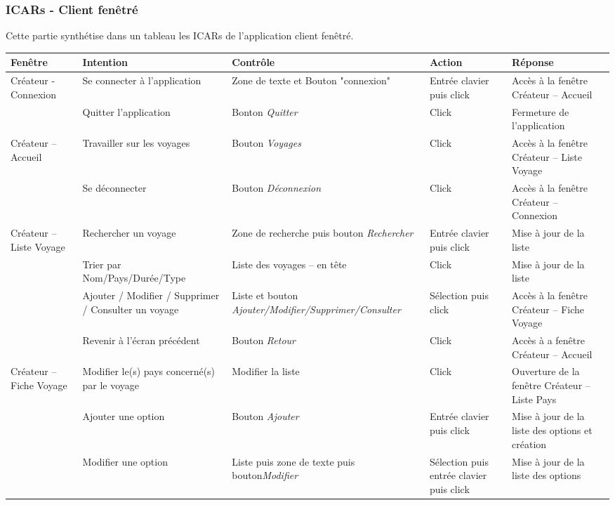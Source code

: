 \documentclass[11pt]{article}
\begin{document}
\subsubsection{ICARs - Client fenêtré}
Cette partie synthétise dans un tableau les ICARs de l'application client fenêtré.\\
\begin{center}
\begin{footnotesize}
\begin{supertabular}{|p{2cm}|p{3cm}|p{3.5cm}|p{2cm}|p{4cm}|}
\hline         
\bf{Fenêtre} & \bf{Intention} & \bf{Contrôle} & \bf{Action} & \bf{Réponse} \\ \hline
Créateur - Connexion & Se connecter à l'application & Zone de texte et Bouton "connexion" & Entrée clavier puis click & Accès à la fenêtre Créateur – Accueil   \\ \hline
& Quitter l'application & Bonton \emph{Quitter} & Click & Fermeture de l'application \\ \hline
Créateur – Accueil & Travailler sur les voyages & Bouton \emph{Voyages} & Click & Accès à la fenêtre Créateur – Liste Voyage \\ \hline
 & Se déconnecter & Bouton \emph{Déconnexion} & Click & Accès à la fenêtre Créateur – Connexion \\ \hline
Créateur – Liste Voyage & Rechercher un voyage & Zone de recherche puis bouton \emph{Rechercher} & Entrée clavier puis click & Mise à jour de la liste \\ \hline
 & Trier par Nom/Pays/Durée/Type & Liste des voyages – en tête & Click & Mise à jour de la liste \\ \hline
 & Ajouter / Modifier / Supprimer / Consulter un voyage & Liste et bouton \emph{Ajouter/Modifier/Supprimer/Consulter} & Sélection puis click & Accès à la fenêtre Créateur – Fiche Voyage \\ \hline
 & Revenir à l’écran précédent & Bouton \emph{Retour} & Click & Accès à a fenêtre Créateur – Accueil \\ \hline
Créateur – Fiche Voyage & Modifier le(s) pays concerné(s) par le voyage & Modifier la liste & Click & Ouverture de la  fenêtre Créateur – Liste Pays \\ \hline
 & Ajouter une option & Bouton \emph{Ajouter} & Entrée clavier puis click & Mise à jour de la  liste des options et création \\ \hline
 & Modifier une option & Liste puis zone de texte puis bouton\emph{Modifier} & Sélection puis entrée clavier puis click & Mise à jour de la  liste des options \\ \hline

\end{supertabular}
\end{footnotesize}
\end{center}
\end{document}
